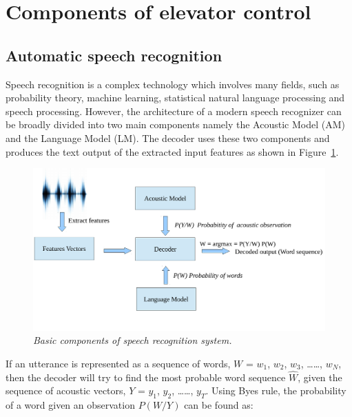 \documentclass[a4paper, 12pt]{article}
\begin{document}


\pagestyle{empty}

\pagestyle{plain}
\setcounter{page}{1}
\tableofcontents
\cleardoublepage

\section{Components of elevator control}

\subsection{Automatic speech recognition}
Speech recognition is a complex technology which involves many fields, such as probability theory, machine learning, statistical natural language processing and speech processing. However, the architecture of a modern speech recognizer can be broadly divided into two main components namely the Acoustic Model (AM) and the Language Model (LM). The decoder uses these two components and produces the text output of the extracted input features as shown in Figure~\ref{fig:asr_component1}. 
\begin{figure}[ht]
\centering
\includegraphics[width=\textwidth]{ASR_Component1.pdf}
\vspace{-1.2cm}
\caption{\textit{Basic components of speech recognition system.}}
\label{fig:asr_component1}
\end{figure}
If an utterance is represented as a sequence of words, $W$ = $w_1$, $w_2$, $w_3$, \dots \dots, $w_N$, then the decoder will try to find the most probable word sequence $\hat{W}$, given the sequence of acoustic vectors, $Y$ = $y_1$, $y_2$, \dots \dots, $y_T$. Using Byes rule, the probability of a word given an observation $P(W/Y)$ can be found as: 
\end{document}
